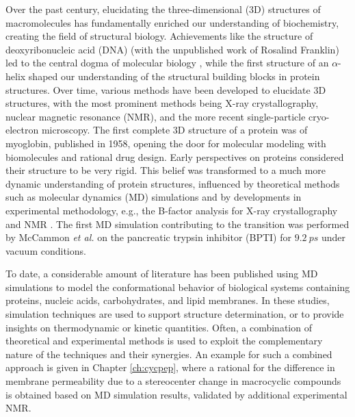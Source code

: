 Over the past century, elucidating the three-dimensional (3D) structures of macromolecules has fundamentally enriched our understanding of biochemistry,\cite{Shi2014, Wagner1997} creating the field of structural biology. Achievements like the structure of deoxyribonucleic acid (DNA)\cite{Watson1953} (with the unpublished work of Rosalind Franklin\cite{Elkin2003}) led to the central dogma of molecular biology \cite{Crick1970}, while the first structure of an $\alpha$-helix \cite{Pauling1951} shaped our understanding of the structural building blocks in protein structures. Over time, various methods have been developed to elucidate 3D structures, with the most prominent methods being X-ray crystallography\cite{Ladd1977, Shi2014}, nuclear magnetic resonance (NMR),\cite{Wagner1997,  Shi2014, Jacobsen2007, Markwick2008} and the more recent single-particle cryo-electron microscopy\cite{Doerr2016, Agard2014, Cheng2017, Kuhlbrandt2014}. The first complete 3D structure of a protein was of myoglobin\cite{Kendrew1958}, published in 1958, opening the door for molecular modeling with biomolecules and rational drug design.
Early perspectives on proteins considered their structure to be very rigid.  \cite{Karplus2002} This belief was transformed to a much more dynamic understanding of protein structures, influenced by theoretical methods such as molecular dynamics (MD) simulations \cite{Karplus2002, Phillips1981} and by developments in experimental methodology, e.g., the B-factor analysis for X-ray crystallography\cite{Frauenfelder1979} and NMR \cite{Wuthrich1975, Torchia1984, Dobson1986}. The first MD simulation contributing to the transition was performed by McCammon \textit{et al.} on the pancreatic trypsin inhibitor (BPTI) for $9.2~ps$ under vacuum conditions. \cite{Mccammon1977} 

To date, a considerable amount of literature has been published using MD simulations to model the conformational behavior of biological systems containing proteins, nucleic acids, carbohydrates, and lipid membranes. \cite{Leach2001, Karplus2002, Chavent2014, Hollingsworth2018} In these studies, simulation techniques are used to support structure determination, or to provide insights on thermodynamic or kinetic quantities. \cite{Gunsteren1990, Karplus2002} 
Often, a combination of theoretical and experimental methods is used to exploit the complementary nature of the techniques and their synergies. \cite{Gunsteren2008} An example for such a combined approach is given in Chapter \ref{ch:cycpep}, where a rational for the difference in membrane permeability due to a stereocenter change in macrocyclic compounds   is obtained based on MD simulation results,  validated by additional experimental NMR.

